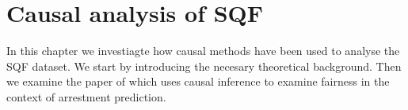 \section*{Causal analysis of SQF}
In this chapter we investiagte how causal methods have been used to analyse the SQF dataset.
We start by introducing the necesary theoretical background. Then
we examine the paper of \cite{Khademi2019FADMELC} which uses causal inference to examine
fairness in the context of arrestment prediction.

